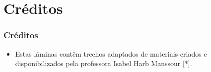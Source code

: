 \documentclass[aspectratio=169]{beamer}
\begin{document}

\section{Créditos}

\begin{frame}\frametitle{Créditos}
\begin{itemize}
	\item Estas lâminas contêm trechos adaptados de materiais criados e disponibilizados pela professora Isabel Harb Manssour [*].
\end{itemize}
\end{frame}

\end{document}
